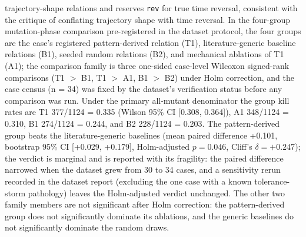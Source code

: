\documentclass[manuscript,screen,review]{acmart}
\begin{document}
trajectory-shape relations and reserves \texttt{rev} for true time
reversal, consistent with the critique of conflating trajectory shape with
time reversal. In
the four-group mutation-phase comparison pre-registered in the dataset
protocol, the four groups are the case's registered pattern-derived
relation (T1), literature-generic baseline relations (B1), seeded
random relations (B2), and mechanical ablations of T1 (A1); the
comparison family is three one-sided case-level Wilcoxon signed-rank
comparisons (T1 $>$ B1, T1 $>$ A1, B1 $>$ B2) under Holm correction,
and the case census (n = 34) was fixed by the dataset's verification
status before any comparison was run. Under the primary all-mutant
denominator the group kill rates are T1 377/1124 = 0.335 (Wilson 95\%
CI {[}0.308, 0.364{]}), A1 348/1124 = 0.310, B1 274/1124 = 0.244, and
B2 228/1124 = 0.203. The pattern-derived group beats the
literature-generic baselines (mean paired difference +0.101, bootstrap
95\% CI {[}+0.029, +0.179{]}, Holm-adjusted \(p=0.046\), Cliff's
\(\delta=+0.247\)); the verdict is marginal and is reported with its
fragility: the paired difference narrowed when the dataset grew from 30
to 34 cases, and a sensitivity rerun recorded in the dataset report
(excluding the one case with a known tolerance-storm pathology) leaves
the Holm-adjusted verdict unchanged. The other two family members are
not significant after Holm correction: the pattern-derived group does
not significantly dominate its ablations, and the generic baselines do
not significantly dominate the random draws.
\end{document}
